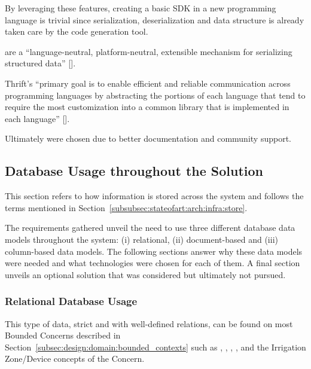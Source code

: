 By leveraging these features, creating a basic \gls{SDK} in a new programming language is trivial since serialization, deserialization and data structure is already taken care by the code generation tool.

 are a ``language-neutral, platform-neutral, extensible mechanism for serializing structured data'' [\cite{proto}].

Thrift's ``primary goal is to enable efficient and reliable communication across programming languages by abstracting the portions of each language that tend to require the most customization into a common library that is implemented in each language'' [\cite{thrift}].

Ultimately  were chosen due to better documentation and community support.

\subsection{Database Usage throughout the Solution}
\label{subsec:implementation:decisions:database}

This section refers to how information is stored across the system and follows the terms mentioned in Section~\ref{subsubsec:stateofart:arch:infra:store}.

The requirements gathered unveil the need to use three different database data models throughout the system: (i) relational, (ii) document-based and (iii) column-based data models. The following sections answer why these data models were needed and what technologies were chosen for each of them. A final section unveils an optional solution that was considered but ultimately not pursued.

\subsubsection{Relational Database Usage}
\label{subsubsec:implementation:decisions:database:relational}

This type of data, strict and with well-defined relations, can be found on most Bounded Concerns described in Section~\ref{subsec:design:domain:bounded_contexts} such as , , , ,  and the Irrigation Zone/Device concepts of the  Concern.

